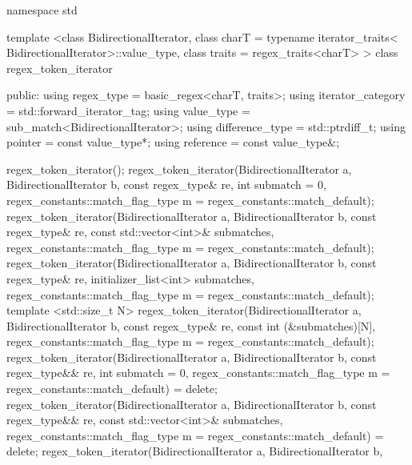 \begin{codeblock}
namespace std {
  template <class BidirectionalIterator, 
            class charT = typename iterator_traits<
              BidirectionalIterator>::value_type,
              class traits = regex_traits<charT> >
  class regex_token_iterator  {
  public:
    using regex_type        = basic_regex<charT, traits>;
    using iterator_category = std::forward_iterator_tag;
    using value_type        = sub_match<BidirectionalIterator>;
    using difference_type   = std::ptrdiff_t;
    using pointer           = const value_type*;
    using reference         = const value_type&;

    regex_token_iterator();
    regex_token_iterator(BidirectionalIterator a, BidirectionalIterator b, 
                        const regex_type& re, 
                        int submatch = 0, 
                        regex_constants::match_flag_type m =
                          regex_constants::match_default);
    regex_token_iterator(BidirectionalIterator a, BidirectionalIterator b, 
                        const regex_type& re, 
                        const std::vector<int>& submatches, 
                        regex_constants::match_flag_type m =
                          regex_constants::match_default);
    regex_token_iterator(BidirectionalIterator a, BidirectionalIterator b,
                        const regex_type& re,
                        initializer_list<int> submatches,
                        regex_constants::match_flag_type m =
                          regex_constants::match_default);
    template <std::size_t N>
      regex_token_iterator(BidirectionalIterator a, BidirectionalIterator b, 
                        const regex_type& re, 
                        const int (&submatches)[N], 
                        regex_constants::match_flag_type m =
                          regex_constants::match_default);
    regex_token_iterator(BidirectionalIterator a, BidirectionalIterator b,
                         const regex_type&& re,
                         int submatch = 0,
                         regex_constants::match_flag_type m =
                           regex_constants::match_default) = delete;
    regex_token_iterator(BidirectionalIterator a, BidirectionalIterator b,
                         const regex_type&& re,
                         const std::vector<int>& submatches,
                         regex_constants::match_flag_type m =
                           regex_constants::match_default) = delete;
    regex_token_iterator(BidirectionalIterator a, BidirectionalIterator b,
}}
\end{codeblock}
